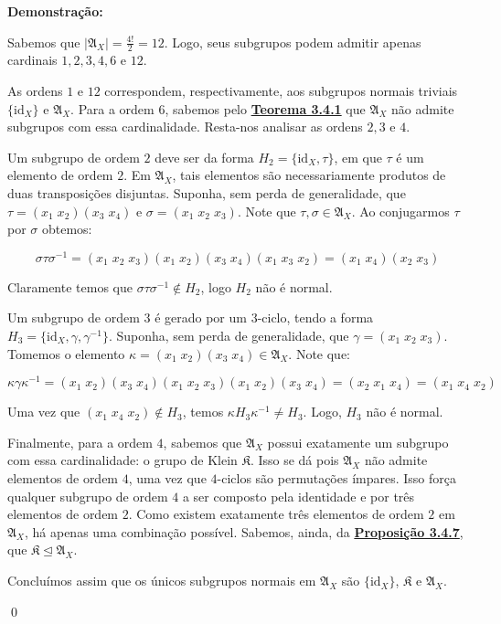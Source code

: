 \documentclass[16pt,openany]{book}
\theoremstyle{definition}
\begin{document}
{\color{red}
\textbf{Demonstração:}

Sabemos que $\vert \mathfrak{A}_X\vert = \frac{4!}{2} = 12$. Logo, seus subgrupos podem admitir apenas cardinais $1,2,3,4,6$ e $12$.

As ordens $1$ e $12$ correspondem, respectivamente, aos subgrupos normais triviais $\{\text{id}_X\}$ e $\mathfrak{A}_X$. Para a ordem $6$, sabemos pelo \hyperlink{teo241}{\textbf{Teorema 3.4.1}} que $\mathfrak{A}_X$ não admite subgrupos com essa cardinalidade. Resta-nos analisar as ordens $2, 3$ e $4$.

Um subgrupo de ordem $2$ deve ser da forma $H_2 = \{\text{id}_X, \tau\}$, em que $\tau$ é um elemento de ordem $2$. Em $\mathfrak{A}_X$, tais elementos são necessariamente produtos de duas transposições disjuntas. Suponha, sem perda de generalidade, que $\tau = (x_1\;x_2)(x_3\;x_4)$ e $\sigma = (x_1\;x_2\;x_3)$. Note que $\tau,\sigma \in \mathfrak{A}_X$. Ao conjugarmos $\tau$ por $\sigma$ obtemos:

\[
\sigma\tau\sigma^{-1} = (x_1\;x_2\;x_3)(x_1\;x_2)(x_3\;x_4)(x_1\;x_3\;x_2) = (x_1\;x_4)(x_2\;x_3)
\]

Claramente temos que $\sigma\tau\sigma^{-1} \notin H_2$, logo $H_2$ não é normal.

Um subgrupo de ordem $3$ é gerado por um $3$-ciclo, tendo a forma $H_3 = \{\text{id}_X, \gamma, \gamma^{-1}\}$. Suponha, sem perda de generalidade, que $\gamma = (x_1\;x_2\;x_3)$. Tomemos o elemento $\kappa = (x_1\;x_2)(x_3\;x_4) \in \mathfrak{A}_X$. Note que: 

\[
\kappa\gamma\kappa^{-1} = (x_1\;x_2)(x_3\;x_4)(x_1\;x_2\;x_3)(x_1\;x_2)(x_3\;x_4) = (x_2\;x_1\;x_4) = (x_1\;x_4\;x_2)
\]

Uma vez que $(x_1\;x_4\;x_2) \notin H_3$, temos $\kappa H_3 \kappa^{-1} \neq H_3$. Logo, $H_3$ não é normal.

Finalmente, para a ordem $4$, sabemos que $\mathfrak{A}_X$ possui exatamente um subgrupo com essa cardinalidade: o grupo de Klein $\mathfrak{K}$. Isso se dá pois $\mathfrak{A}_X$ não admite elementos de ordem $4$, uma vez que $4$-ciclos são permutações ímpares. Isso força qualquer subgrupo de ordem $4$ a ser composto pela identidade e por três elementos de ordem $2$. Como existem exatamente três elementos de ordem $2$ em $\mathfrak{A}_X$, há apenas uma combinação possível. Sabemos, ainda, da \hyperlink{prop247}{\textbf{Proposição 3.4.7}}, que $\mathfrak{K}\trianglelefteq \mathfrak{A}_X$.

Concluímos assim que os únicos subgrupos normais em $\mathfrak{A}_X$ são $\{\text{id}_X\}$, $\mathfrak{K}$ e $\mathfrak{A}_X$.

\qed}
\end{document}
